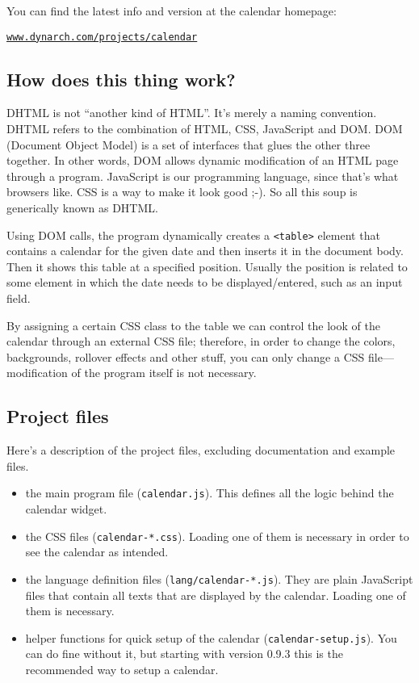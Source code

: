 \documentclass[a4paper,twoside,10pt]{dynadoc}
\begin{document}
You can find the latest info and version at the calendar homepage:

\begin{center}
{\href{http://www.dynarch.com/projects/calendar/}
{\texttt{www.dynarch.com/projects/calendar}}}
\end{center}

\subsection{How does this thing work?}

DHTML is not ``another kind of HTML''.  It's merely a naming convention.  DHTML
refers to the combination of HTML, CSS, JavaScript and DOM.  DOM (Document
Object Model) is a set of interfaces that glues the other three together.  In
other words, DOM allows dynamic modification of an HTML page through a program.
JavaScript is our programming language, since that's what browsers like.  CSS
is a way to make it look good ;-).  So all this soup is generically known as
DHTML.

Using DOM calls, the program dynamically creates a \texttt{<table>} element
that contains a calendar for the given date and then inserts it in the document
body.  Then it shows this table at a specified position.  Usually the position
is related to some element in which the date needs to be displayed/entered,
such as an input field.

By assigning a certain CSS class to the table we can control the look of the
calendar through an external CSS file; therefore, in order to change the
colors, backgrounds, rollover effects and other stuff, you can only change a
CSS file---modification of the program itself is not necessary.

\subsection{Project files}

Here's a description of the project files, excluding documentation and example
files.

\begin{itemize}

\item the main program file (\texttt{calendar.js}).  This defines all the logic
behind the calendar widget.

\item the CSS files (\texttt{calendar-*.css}).  Loading one of them is
necessary in order to see the calendar as intended.

\item the language definition files (\texttt{lang/calendar-*.js}).  They are
plain JavaScript files that contain all texts that are displayed by the
calendar.  Loading one of them is necessary.

\item helper functions for quick setup of the calendar
(\texttt{calendar-setup.js}).  You can do fine without it, but starting with
version 0.9.3 this is the recommended way to setup a calendar.

\end{itemize}
\end{document}
